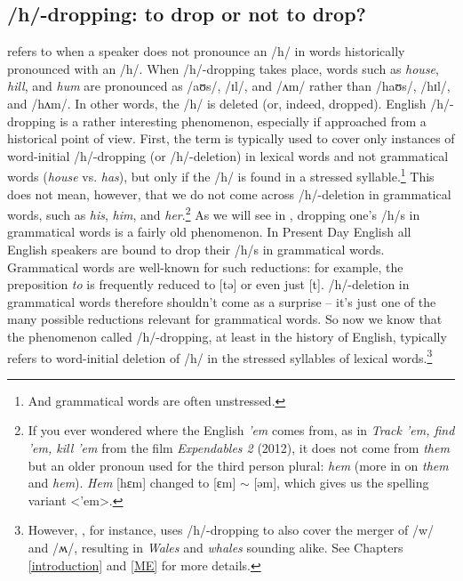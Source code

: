 \subsection{/h/-dropping: to drop or not to drop?}\label{LModE-hdrop}
 refers to when a speaker does not pronounce an /h/ in words historically pronounced with an /h/. When /h/-dropping takes place, words such as \textit{house}, \textit{hill}, and \textit{hum} are pronounced as /aʊs/, /ɪl/, and /ʌm/ rather than /haʊs/, /hɪl/, and /hʌm/. In other words, the /h/ is deleted (or, indeed, dropped). English /h/-dropping is a rather interesting phenomenon, especially if approached from a historical point of view. First, the term is typically used to cover only instances of word-initial /h/-dropping (or /h/-deletion) in lexical words and not grammatical words (\textit{house} vs. \textit{has}), but only if the /h/ is found in a stressed syllable.\footnote{And grammatical words are often unstressed.} This does not mean, however, that we do not come across /h/-deletion in grammatical words, such as \textit{his}, \textit{him}, and \textit{her}.\footnote{If you ever wondered where the English \textit{'em} comes from, as in \textit{Track 'em, find 'em, kill 'em} from the film \emph{Expendables 2} (2012), it does not come from \textit{them} but an older pronoun used for the third person plural: \textit{hem} (more in  on \textit{them} and \textit{hem}). \textit{Hem} [hɛm] changed to [ɛm] $\sim$ [əm], which gives us the spelling variant <'em>.} As we will see in , dropping one's /h/s in grammatical words is a fairly old phenomenon. In Present Day English all English speakers are bound to drop their /h/s in grammatical words. Grammatical words are well-known for such reductions: for example, the preposition \textit{to} is frequently reduced to {[}tə{]} or even just {[}t{]}. /h/-deletion in grammatical words therefore shouldn't come as a surprise -- it's just one of the many possible reductions relevant for grammatical words. So now we know that the phenomenon called /h/-dropping, at least in the history of English, typically refers to word-initial deletion of /h/ in the stressed syllables of lexical words.\footnote{However, \citet[157]{Beal2004}, for instance, uses /h/-dropping to also cover the merger of /w/ and /ʍ/, resulting in \textit{Wales} and \textit{whales} sounding alike. See Chapters \ref{introduction} and \ref{ME} for more details.}

